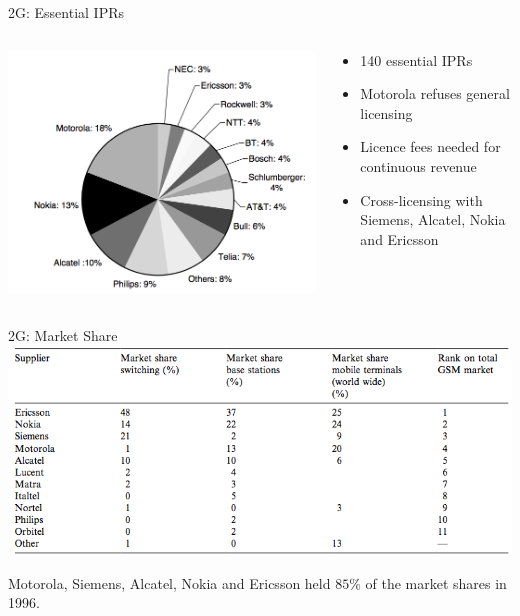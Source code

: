 \begin{frame}{2G: Essential IPRs \cite{Bekkers2002171}}
  \begin{columns}
      \begin{column}{0.55\textwidth}
          \includegraphics[width=\textwidth]{pictures/iprs}
      \end{column}
      \hfill
    
      \begin{column}{0.45\textwidth}
          \begin{itemize}
              \item 140 essential IPRs
              \item Motorola refuses general licensing
              \item Licence fees needed for continuous revenue
              \item Cross-licensing with Siemens, Alcatel, Nokia and Ericsson
          \end{itemize}
      \end{column}
      \end{columns}
\end{frame}

\begin{frame}{2G: Market Share}
  \includegraphics[width=\textwidth]{pictures/2gmarketshares}
  
  Motorola, Siemens, Alcatel, Nokia and Ericsson held $85\%$ of the market shares in 1996. \cite{Bekkers2002171}
\end{frame}


